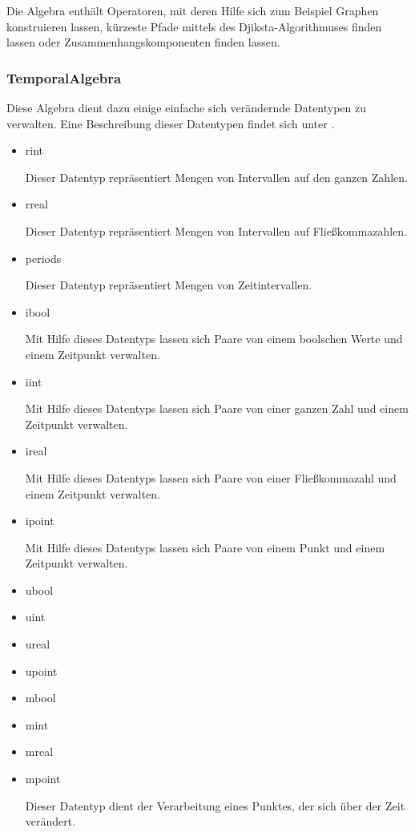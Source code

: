 Die Algebra enthält Operatoren, mit deren Hilfe sich zum Beispiel Graphen konstruieren lassen, kürzeste Pfade mittels des Djiksta-Algorithmuses finden lassen oder Zusammenhangskomponenten finden lassen.

\subsubsection{TemporalAlgebra}

Diese Algebra dient dazu einige einfache sich verändernde Datentypen zu verwalten. Eine Beschreibung dieser Datentypen findet sich unter \cite{FGNS}.
\begin{itemize}
\item rint

Dieser Datentyp repräsentiert Mengen von Intervallen auf den ganzen Zahlen.
\item rreal

Dieser Datentyp repräsentiert Mengen von Intervallen auf Fließkommazahlen.
\item periods

Dieser Datentyp repräsentiert Mengen von Zeitintervallen.
\item ibool

Mit Hilfe dieses Datentyps lassen sich Paare von einem boolschen Werte und einem Zeitpunkt verwalten.
\item iint

Mit Hilfe dieses Datentyps lassen sich Paare von einer ganzen Zahl und einem Zeitpunkt verwalten.
\item ireal

Mit Hilfe dieses Datentyps lassen sich Paare von einer Fließkommazahl und einem Zeitpunkt verwalten.
\item ipoint

Mit Hilfe dieses Datentyps lassen sich Paare von einem Punkt und einem Zeitpunkt verwalten.
\item ubool

\item uint

\item ureal

\item upoint

\item mbool

\item mint

\item mreal

\item mpoint

Dieser Datentyp dient der Verarbeitung eines Punktes, der sich über der Zeit verändert.
\end{itemize}



